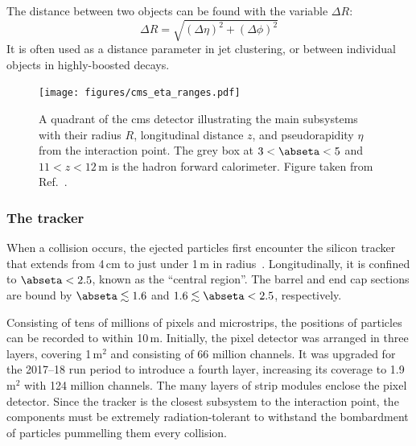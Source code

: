 The distance between two objects can be found with the variable $\Delta R$:
\begin{equation}
\Delta R = \sqrt{(\Delta \eta)^2 + (\Delta \phi)^2}
\label{eq:delta_r}
\end{equation}
It is often used as a distance parameter in jet clustering, or between individual objects in highly-boosted decays.

\begin{figure}[htbp]
    \centering
    \texttt{[image: figures/cms\_eta\_ranges.pdf]}
    \caption[A quadrant of the CMS detector illustrating the main subsystems with their radius $R$, longitudinal distance $z$, and pseudorapidity $\eta$ from the interaction point]{A quadrant of the \acrshort{cms} detector illustrating the main subsystems with their radius $R$, longitudinal distance $z$, and pseudorapidity $\eta$ from the interaction point. The grey box at $3 < \abseta < 5$ and $11 < z < 12$\,m is the hadron forward calorimeter. Figure taken from Ref.~.}
    \label{fig:cms_eta_bounds}
\end{figure}




\subsubsection{The tracker}
\label{subsubsec:cms_tracker}

When a collision occurs, the ejected particles first encounter the silicon tracker that extends from 4\,cm to just under 1\,m in radius~\cite{Karimäki:368412,CERN-LHCC-2000-016}. Longitudinally, it is confined to $\abseta < \text{2.5}$, known as the ``central region''. The barrel and end cap sections are bound by $\abseta \lesssim \text{1.6}$ and $\text{1.6} \lesssim \abseta < \text{2.5}$, respectively.

Consisting of tens of millions of pixels and microstrips, the positions of particles can be recorded to within 10\,\si{\micro}m. Initially, the pixel detector was arranged in three layers, covering 1\,m$^2$ and consisting of 66 million channels. It was upgraded for the 2017--18 run period to introduce a fourth layer, increasing its coverage to 1.9\,m$^2$ with 124 million channels. The many layers of strip modules enclose the pixel detector. Since the tracker is the closest subsystem to the interaction point, the components must be extremely radiation-tolerant to withstand the bombardment of particles pummelling them every collision.

